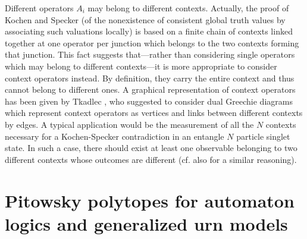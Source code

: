 Different operators $A_i$ may belong to different contexts.
Actually, the proof of Kochen and Specker \cite{kochen1}
(of the nonexistence of consistent global truth values by associating such valuations
locally) is based on a finite chain of contexts linked together at one
operator per junction which belongs to the two contexts forming that junction.
This fact suggests that---rather than considering single operators
which may belong to different contexts---it is more appropriate
to  consider context operators instead. By definition, they carry the
entire context and thus cannot belong to different ones.
A graphical representation of context operators has been given
by Tkadlec \cite{tkadlec-96}, who suggested to consider dual Greechie diagrams
which represent context operators as vertices and links between different contexts
by edges.
A typical application would be the measurement of all the $N$ contexts
necessary for a Kochen-Specker contradiction
in an entangle $N$ particle singlet state.
In such a case, there should exist at least one observable
belonging to two different contexts whose outcomes are different
(cf. also \cite{hey-red} for a similar reasoning).

\section{Pitowsky polytopes for automaton logics and
generalized urn models}


